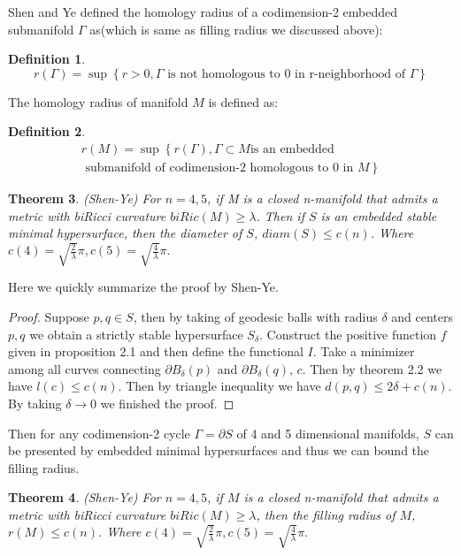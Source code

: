 \documentclass{amsart}
\newtheorem{theorem}{Theorem}[section]
\theoremstyle{definition}
\newtheorem{definition}[theorem]{Definition}
\theoremstyle{remark}
\numberwithin{equation}{section}
\begin{document}
Shen and Ye defined the homology radius of a codimension-2 embedded submanifold $\Gamma$ as(which is same as filling radius we discussed above):
\begin{definition}
\begin{equation}
 r(\Gamma)=\sup\left\{r>0, \Gamma \text{ is not homologous to 0 in r-neighborhood of }\Gamma \right\}
\end{equation}
\end{definition}
The homology radius of manifold $M$ is defined as:
\begin{definition}

\begin{equation}
\begin{aligned}
r(M)=\sup\left\{r(\Gamma), \Gamma\subset M \text{is an embedded} \right.\\
\left. \text{ submanifold of codimension-2 homologous to 0 in }M \right\}
 \end{aligned}
\end{equation}  
\end{definition}
\begin{theorem}(Shen-Ye\cite{sr96})
    For $n=4,5$, if M is a closed n-manifold that admits a metric with biRicci curvature $biRic(M)\geq \lambda$. Then if $S$ is an embedded stable minimal hypersurface, then the diameter of $S$, $diam(S)\leq c(n)$. Where $c(4)=\sqrt{\frac{2}{\lambda}}\pi, c(5)=\sqrt{\frac{4}{\lambda}}\pi .$
\end{theorem}
Here we quickly summarize the proof by Shen-Ye. 
\begin{proof}
Suppose $p,q\in S$, then by taking of geodesic balls with radius $\delta$ and centers $p,q$ we obtain a strictly stable hypersurface $S_{\delta}$. Construct the positive function $f$ given in proposition 2.1 and then define the functional $I$. Take a minimizer among all curves connecting $\partial B_{\delta}(p)$ and $\partial B_{\delta}(q)$, $c$. Then by theorem 2.2 we have $l(c)\leq c(n)$. Then by triangle inequality we have $d(p,q)\leq 2\delta+c(n) $. By taking $\delta\rightarrow 0$ we finished the proof. 
\end{proof}

Then for any codimension-2 cycle $\Gamma=\partial S$ of 4 and 5 dimensional manifolds, $S$ can be presented by embedded minimal hypersurfaces and thus we can bound the filling radius.
\begin{theorem}(Shen-Ye\cite{sr96})
    For $n=4,5$, if $M$ is a closed n-manifold that admits a metric with biRicci curvature $biRic(M)\geq \lambda$, then the filling radius of $M$, $r(M)\leq c(n)$. Where $c(4)=\sqrt{\frac{2}{\lambda}}\pi, c(5)=\sqrt{\frac{4}{\lambda}}\pi .$
\end{theorem}
\end{document}
